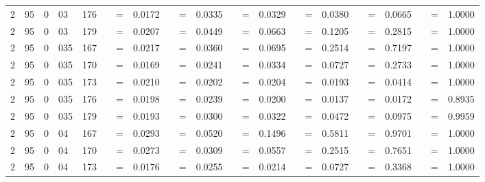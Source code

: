 \begin{tabular*}{260mm}{r@{.}lr@{.}lc|ccc:ccc:ccc:ccc:ccc|ccc}
		2&95	&	0&03	&	176	&	 &=& 0.0172 & 	 &=& 0.0335 & 	 &=& 0.0329 & 	 &=& 0.0380 & 	 &=& 0.0665 & 	 &=& 1.0000 \\ 
		2&95	&	0&03	&	179	&	 &=& 0.0207 & 	 &=& 0.0449 & 	 &=& 0.0663 & 	 &=& 0.1205 & 	 &=& 0.2815 & 	 &=& 1.0000 \\ 
		2&95	&	0&035	&	167	&	 &=& 0.0217 & 	 &=& 0.0360 & 	 &=& 0.0695 & 	 &=& 0.2514 & 	 &=& 0.7197 & 	 &=& 1.0000 \\ 
		2&95	&	0&035	&	170	&	 &=& 0.0169 & 	 &=& 0.0241 & 	 &=& 0.0334 & 	 &=& 0.0727 & 	 &=& 0.2733 & 	 &=& 1.0000 \\ 
		2&95	&	0&035	&	173	&	 &=& 0.0210 & 	 &=& 0.0202 & 	 &=& 0.0204 & 	 &=& 0.0193 & 	 &=& 0.0414 & 	 &=& 1.0000 \\ 
		2&95	&	0&035	&	176	&	 &=& 0.0198 & 	 &=& 0.0239 & 	 &=& 0.0200 & 	 &=& 0.0137 & 	 &=& 0.0172 & 	 &=& 0.8935 \\ 
		2&95	&	0&035	&	179	&	 &=& 0.0193 & 	 &=& 0.0300 & 	 &=& 0.0322 & 	 &=& 0.0472 & 	 &=& 0.0975 & 	 &=& 0.9959 \\ 
		2&95	&	0&04	&	167	&	 &=& 0.0293 & 	 &=& 0.0520 & 	 &=& 0.1496 & 	 &=& 0.5811 & 	 &=& 0.9701 & 	 &=& 1.0000 \\ 
		2&95	&	0&04	&	170	&	 &=& 0.0273 & 	 &=& 0.0309 & 	 &=& 0.0557 & 	 &=& 0.2515 & 	 &=& 0.7651 & 	 &=& 1.0000 \\ 
		2&95	&	0&04	&	173	&	 &=& 0.0176 & 	 &=& 0.0255 & 	 &=& 0.0214 & 	 &=& 0.0727 & 	 &=& 0.3368 & 	 &=& 1.0000 \\ 

\end{tabular*}
